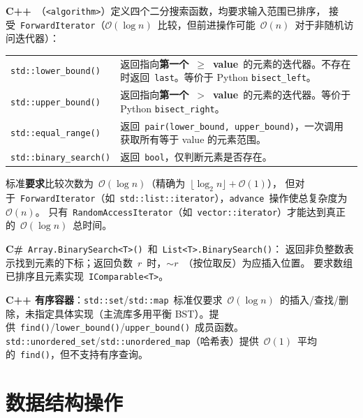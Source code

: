 \documentclass[12pt,a4paper,fontset=fandol]{ctexbook}
\newcommand{\bigO}[1]{\mathcal{O}(#1)}
\newcommand{\header}[1]{\texttt{<#1>}}
\newcommand{\Fn}[1]{\texttt{#1()}}
\newcommand{\Tp}[1]{\texttt{#1}}
\begin{document}
\begin{stdspec}[title=二分搜索族]
\textbf{C++}~（\header{algorithm}）定义四个二分搜索函数，均要求输入范围已排序，
接受~\Tp{ForwardIterator}（$\bigO{\log n}$~比较，但前进操作可能~$\bigO{n}$~对于非随机访问迭代器）：

\begin{tabularx}{\textwidth}{@{}l >{\raggedright\arraybackslash}X@{}}
  \Fn{std::lower\_bound} & 返回指向\textbf{第一个~$\geq$~value}~的元素的迭代器。不存在时返回~\texttt{last}。等价于 Python \texttt{bisect\_left}。 \\
  \Fn{std::upper\_bound} & 返回指向\textbf{第一个~$>$~value}~的元素的迭代器。等价于 Python \texttt{bisect\_right}。 \\
  \Fn{std::equal\_range} & 返回~\texttt{pair(lower\_bound, upper\_bound)}，一次调用获取所有等于 value 的元素范围。 \\
  \Fn{std::binary\_search} & 返回~\texttt{bool}，仅判断元素是否存在。 \\
\end{tabularx}

\medskip
标准\textbf{要求}比较次数为~$\bigO{\log n}$（精确为~$\lfloor\log_2 n\rfloor + \bigO{1}$），
但对于~\Tp{Forward\allowbreak{}Iterator}（如~\Tp{std::list::iterator}），\texttt{advance}~操作使总复杂度为~$\bigO{n}$。
只有~\Tp{Random\allowbreak{}Access\allowbreak{}Iterator}（如~\Tp{vector::iterator}）才能达到真正的~$\bigO{\log n}$~总时间。

\medskip\noindent\textbf{C\#}~\Fn{Array.BinarySearch<T>}~和~\Fn{List<T>.BinarySearch}：
返回非负整数表示找到元素的下标；返回负数~$r$~时，$\sim r$~（按位取反）为应插入位置。
要求数组已排序且元素实现~\Tp{IComparable<T>}。

\medskip
\textbf{C++ 有序容器}：\Tp{std::set}/\allowbreak{}\Tp{std::map}~标准仅要求~$\bigO{\log n}$~的插入/查找/删除，未指定具体实现（主流库多用平衡 BST）。提供~\Fn{find}/\allowbreak{}\Fn{lower\_\allowbreak{}bound}/\allowbreak{}\Fn{upper\_\allowbreak{}bound}~成员函数。
\Tp{std::unordered\_\allowbreak{}set}/\allowbreak{}\Tp{std::unordered\_\allowbreak{}map}（哈希表）提供~$\bigO{1}$~平均的~\Fn{find}，但不支持有序查询。
\end{stdspec}

\part{数据结构操作}
\end{document}
